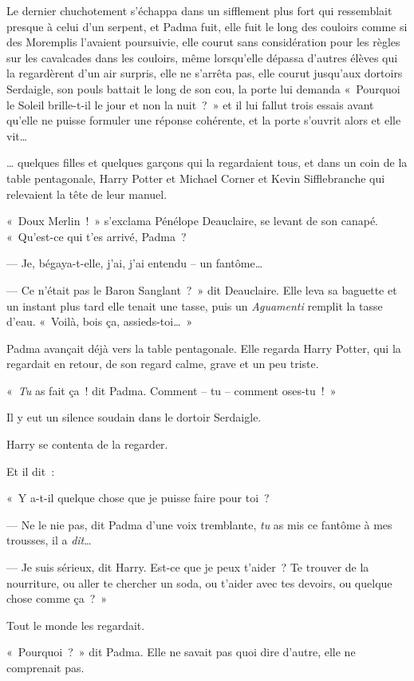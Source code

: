 Le dernier chuchotement s'échappa dans un sifflement plus fort qui ressemblait presque à celui d'un serpent, et Padma fuit, elle fuit le long des couloirs comme si des Moremplis l'avaient poursuivie, elle courut sans considération pour les règles sur les cavalcades dans les couloirs, même lorsqu'elle dépassa d'autres élèves qui la regardèrent d'un air surpris, elle ne s'arrêta pas, elle courut jusqu'aux dortoirs Serdaigle, son pouls battait le long de son cou, la porte lui demanda «~Pourquoi le Soleil brille-t-il le jour et non la nuit~?~» et il lui fallut trois essais avant qu'elle ne puisse formuler une réponse cohérente, et la porte s'ouvrit alors et elle vit…

… quelques filles et quelques garçons qui la regardaient tous, et dans un coin de la table pentagonale, Harry Potter et Michael Corner et Kevin Sifflebranche qui relevaient la tête de leur manuel.

«~Doux Merlin~!~» s'exclama Pénélope Deauclaire, se levant de son canapé. «~Qu'est-ce qui t'es arrivé, Padma~?

--- Je, bégaya-t-elle, j'ai, j'ai entendu -- un fantôme…

--- Ce n'était pas le Baron Sanglant~?~» dit Deauclaire. Elle leva sa baguette et un instant plus tard elle tenait une tasse, puis un \emph{Aguamenti} remplit la tasse d'eau. «~Voilà, bois ça, assieds-toi…~»

Padma avançait déjà vers la table pentagonale. Elle regarda Harry Potter, qui la regardait en retour, de son regard calme, grave et un peu triste.

«~\emph{Tu} as fait ça~! dit Padma. Comment -- tu -- comment oses-tu~!~»

Il y eut un silence soudain dans le dortoir Serdaigle.

Harry se contenta de la regarder.

Et il dit~:

«~Y a-t-il quelque chose que je puisse faire pour toi~?

--- Ne le nie pas, dit Padma d'une voix tremblante, \emph{tu} as mis ce fantôme à mes trousses, il a \emph{dit}…

--- Je suis sérieux, dit Harry. Est-ce que je peux t'aider~? Te trouver de la nourriture, ou aller te chercher un soda, ou t'aider avec tes devoirs, ou quelque chose comme ça~?~»

Tout le monde les regardait.

«~Pourquoi~?~» dit Padma. Elle ne savait pas quoi dire d'autre, elle ne comprenait pas.

